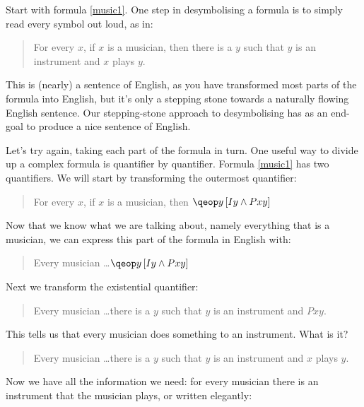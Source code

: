 \documentclass[PHIL101-Textbook.tex]{subfiles}
\begin{document}
\noindent Start with formula \ref{music1}. One step in desymbolising a formula is to simply read every symbol out loud, as in:

\begin{quote}
For every $x$, if $x$ is a musician, then there is a $y$ such that $y$ is an instrument and $x$ plays $y$. 
\end{quote}

\noindent This is (nearly) a sentence of English, as you have transformed most parts of the formula into English, but it's only a stepping stone towards a naturally flowing English sentence.
Our stepping-stone approach to desymbolising has as an end-goal to produce a nice sentence of English.

Let's try again, taking each part of the  formula in turn.
One useful way to divide up a complex formula is quantifier by quantifier. Formula \ref{music1} has two quantifiers. We will start by transforming the outermost quantifier:

\begin{quote}
  For every $x$, if $x$ is a musician, then $\qeb{y}{\atom I y \eand \atom P  xy }$
\end{quote}


\noindent Now that we know what we are talking about, namely everything that is a musician, we can express this part of the formula in English with:

\begin{quote}
  Every musician \dots $\qeb{y}{\atom I y \eand \atom P  xy }$
\end{quote}

\noindent Next we transform the existential quantifier:


\begin{quote}
  Every musician \dots there is a $y$ such that $y$ is an instrument and $P xy $.
\end{quote}

\noindent This tells us that every musician does something to an instrument.
What is it?

\begin{quote}
  Every musician \dots there is a $y$ such that $y$ is an instrument and $x$ plays $y$.
\end{quote}

\noindent Now we have all the information we need: for every musician there is an instrument that the musician plays, or written elegantly:
\end{document}
